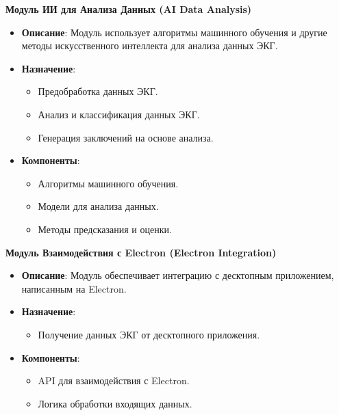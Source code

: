 \documentclass[12pt, russian]{extarticle}
\begin{document}
\begin{spacing}{1.5}
\par \noindent \textbf{Модуль ИИ для Анализа Данных (AI Data Analysis)}
\begin{itemize}
    \item \textbf{Описание}: Модуль использует алгоритмы машинного обучения и другие методы искусственного интеллекта для анализа данных ЭКГ.
    \item \textbf{Назначение}:
    \begin{itemize}
        \item Предобработка данных ЭКГ.
        \item Анализ и классификация данных ЭКГ.
        \item Генерация заключений на основе анализа.
    \end{itemize}
    \item \textbf{Компоненты}:
    \begin{itemize}
        \item Алгоритмы машинного обучения.
        \item Модели для анализа данных.
        \item Методы предсказания и оценки.
    \end{itemize}
\end{itemize}

\par \noindent \textbf{Модуль Взаимодействия с Electron (Electron Integration)}
\begin{itemize}
    \item \textbf{Описание}: Модуль обеспечивает интеграцию с десктопным приложением, написанным на Electron.
    \item \textbf{Назначение}:
    \begin{itemize}
        \item Получение данных ЭКГ от десктопного приложения.
    \end{itemize}
    \item \textbf{Компоненты}:
    \begin{itemize}
        \item API для взаимодействия с Electron.
        \item Логика обработки входящих данных.
    \end{itemize}
\end{itemize}


\end{spacing}
\end{document}
